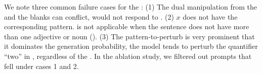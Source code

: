 We note three common failure cases for the \tagstrshorts:
(1) The dual manipulation from the \tagstrs and the blanks can conflict, \eg {} would not respond to .
(2) $x$ does not have the corresponding pattern.  is not applicable when the sentence does not have more than one adjective or noun (\eg {}).
(3) The pattern-to-perturb is very prominent that it dominates the generation probability, \eg the model tends to perturb the quantifier ``two'' in , regardless of the \tagstrshort.
In the ablation study, we filtered out prompts that fell under cases 1 and 2.





